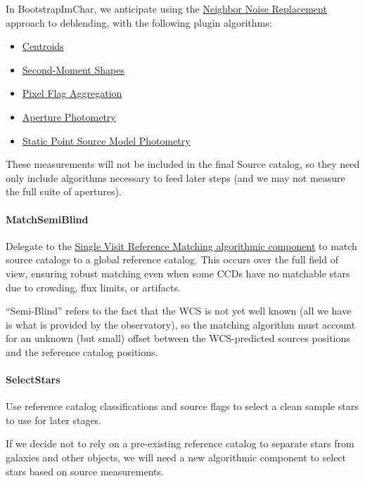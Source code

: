 In BootstrapImChar, we anticipate using the \hyperref[sec:acReplaceNeighborsWithNoise]{Neighbor Noise Replacement} approach to deblending, with the following plugin algorithms:
\begin{itemize}
\item \hyperref[sec:acCentroidAlgorithms]{Centroids}
\item \hyperref[sec:acShapeAlgorithms]{Second-Moment Shapes}
\item \hyperref[sec:acPixelFlags]{Pixel Flag Aggregation}
\item \hyperref[sec:acAperturePhotometry]{Aperture Photometry}
\item \hyperref[sec:acStaticPointSourceModels]{Static Point Source Model Photometry}
\end{itemize}

These measurements will not be included in the final Source catalog, so they need only include algorithms necessary to feed later steps (and we may not measure the full suite of apertures).

\paragraph{MatchSemiBlind}
\label{sec:drpBootstrapImChar_MatchSemiBlind}

Delegate to the \hyperref[sec:acSingleVisitReferenceMatching]{Single Visit Reference Matching algorithmic component} to match source catalogs to a global reference catalog.  This occurs over the full field of view, ensuring robust matching even when some CCDs have no matchable stars due to crowding, flux limits, or artifacts.

``Semi-Blind'' refers to the fact that the WCS is not yet well known (all we have is what is provided by the observatory), so the matching algorithm must account for an unknown (but small) offset between the WCS-predicted sources positions and the reference catalog positions.

\paragraph{SelectStars}
\label{sec:drpBootstrapImChar_SelectStars}

Use reference catalog classifications and source flags to select a clean sample stars to use for later stages.

If we decide not to rely on a pre-existing reference catalog to separate stars from galaxies and other objects, we will need a new algorithmic component to select stars based on source measurements.

